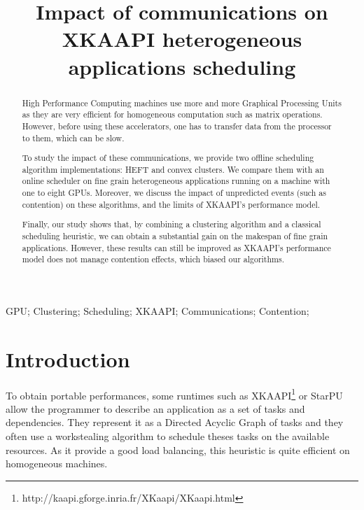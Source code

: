 \documentclass[10pt, conference, compsocconf,pdftex,dvipsnames]{IEEEtran}
\author{\IEEEauthorblockN{David Beniamine, Guillaume Huard}
    \IEEEauthorblockA{
        Université Joseph Fourier\\
        Laboratoire d'Informatique de Grenoble - Inria\\
        38330 Montbonnot St Martin, France\\
    david.beniamine@imag.fr, guillaume.huard@imag.fr}
}
\title{Impact of communications on XKAAPI heterogeneous applications
scheduling}
\begin{document}


\maketitle%
\begin{abstract}
High Performance Computing machines use more and more Graphical Processing
Units as they are very efficient for homogeneous computation such as matrix
operations. However, before using these accelerators, one has to transfer data
from the processor to them, which can be slow. 

To study the impact of these communications, we  provide two offline
scheduling algorithm implementations: HEFT and convex clusters.  We compare
them with an online scheduler on fine grain heterogeneous applications running
on a machine with one to eight GPUs. Moreover, we  discuss the impact of
unpredicted events (such as contention) on these algorithms, and the limits
of XKAAPI's performance model.

Finally, our study shows that, by combining a clustering algorithm and a
classical scheduling heuristic, we can obtain a substantial gain on the
makespan of fine grain applications. However, these results can still be
improved as XKAAPI's performance model does not manage contention effects,
which biased our algorithms.
\end{abstract}

\begin{IEEEkeywords}
    GPU; Clustering; Scheduling; XKAAPI; Communications; Contention;

\end{IEEEkeywords}




\section{Introduction}

To obtain portable performances, some runtimes such as 
XKAAPI\footnote{http://kaapi.gforge.inria.fr/XKaapi/XKaapi.html}
\cite{gautierxkaapi} or StarPU \cite{augonnet2011starpu} allow the programmer
to describe an application as a set of tasks and dependencies. They represent
it as a Directed Acyclic Graph of tasks and they often use a workstealing
algorithm \cite{blumofe1995cilk} to schedule theses tasks on the available
resources. As it provide a good load balancing, this heuristic is quite
efficient on homogeneous machines. 
\end{document}
